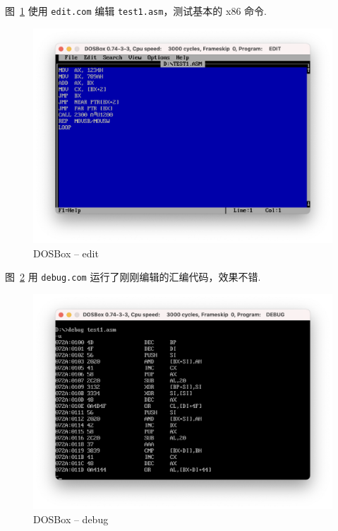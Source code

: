 \documentclass[11pt]{SEU-Digital-Report}
\begin{document}
      图~\ref{fig:dos_edit} 使用 \texttt{edit.com} 编辑 \texttt{test1.asm}，测试基本的 x86 命令.
      \begin{figure}[htbp]
        \centering
        \includegraphics[width=.8\linewidth]{fig/dosbox/edit.png}
        \vspace{-5mm}
        \caption{DOSBox -- edit}
        \label{fig:dos_edit}
      \end{figure}


      图~\ref{fig:dos_debug} 用 \texttt{debug.com} 运行了刚刚编辑的汇编代码，效果不错.
      \begin{figure}[h!]
        \centering
        \includegraphics[width=.8\linewidth]{fig/dosbox/debug.png}
        \vspace{-5mm}
        \caption{DOSBox -- debug}
        \label{fig:dos_debug}
      \end{figure}

      \newpage
\end{document}
